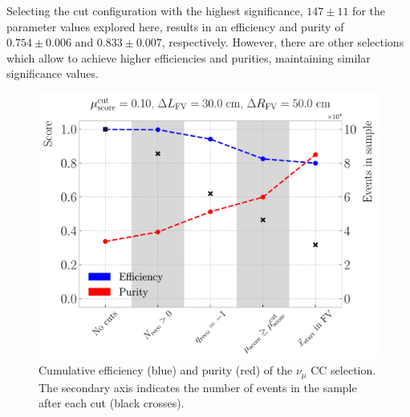 Selecting the cut configuration with the highest significance, $147 \pm 11$ for the parameter values explored here, results in an efficiency and purity of $0.754 \pm 0.006$ and $0.833 \pm 0.007$, respectively. However, there are other selections which allow to achieve higher efficiencies and purities, maintaining similar significance values.

\begin{figure}[t]
	\centering
	\includegraphics[width=.90\linewidth]{Images/GAr_selection/numu_cc_selection_steps.pdf}
	\caption[Cumulative efficiency and purity for the $\nu_{\mu}$ CC selection.]{Cumulative efficiency (blue) and purity (red) of the $\nu_{\mu}$ CC selection. The secondary axis indicates the number of events in the sample after each cut (black crosses).}
	\label{fig:numuCC_selection_steps}
\end{figure}

